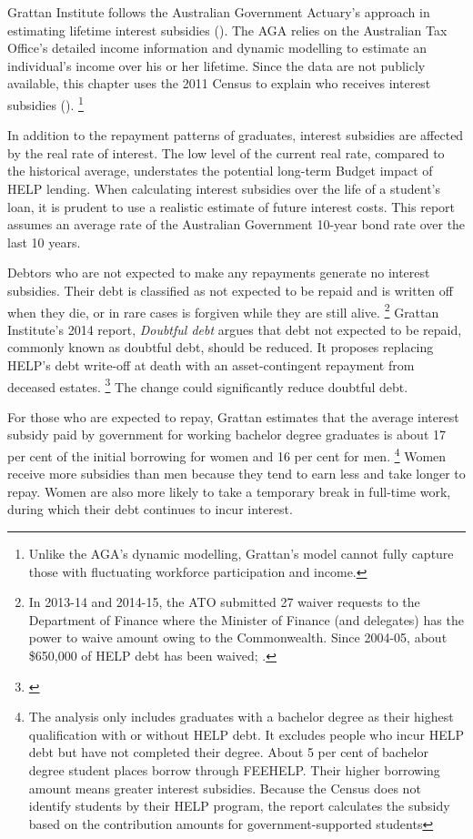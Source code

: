 \documentclass[embargoed]{grattan}
\begin{document}
Grattan Institute follows the Australian Government Actuary's approach in estimating lifetime interest subsidies ().
The \gls{AGA} relies on the Australian Tax Office's detailed income information and dynamic modelling to estimate an individual's income over his or her lifetime.
Since the data are not publicly available, this chapter uses the 2011 Census to explain who receives interest subsidies ().%
\footnote{Unlike the \gls{AGA}'s dynamic modelling, Grattan's model cannot fully capture those with fluctuating workforce participation and income.} \afterpage{\clearpage}

In addition to the repayment patterns of graduates, interest subsidies are affected by the real rate of interest.
The low level of the current real rate, compared to the historical average, understates the potential long-term Budget impact of \gls{HELP} lending.
When calculating interest subsidies over the life of a student's loan, it is prudent to use a realistic estimate of future interest costs.
This report assumes an average rate of the Australian Government 10-year bond rate over the last 10 years.


Debtors who are not expected to make any repayments generate no interest subsidies.
Their debt is classified as not expected to be repaid and is written off when they die, or in rare cases is forgiven while they are still alive.%
\footnote{In 2013-14 and 2014-15, the \gls{ATO} submitted 27 waiver requests to the Department of Finance where the Minister of Finance (and delegates) has the power to waive amount owing to the Commonwealth.
Since 2004-05, about \$650,000 of \gls{HELP} debt has been waived; \textcite[][p. 38]{ANAO2016AdministrationHigherEducation}.} Grattan Institute's 2014 report, \emph{Doubtful debt} argues that debt not expected to be repaid, commonly known as doubtful debt, should be reduced.
It proposes replacing \gls{HELP}'s debt write-off at death with an asset-contingent repayment from deceased estates.%
\footnote{\textcite{Norton2014Doubtfuldebtrising}} The change could significantly reduce doubtful debt.

For those who are expected to repay, Grattan estimates that the average interest subsidy paid by government for working bachelor degree graduates is about 17 per cent of the initial borrowing for women and 16 per cent for men.%
\footnote{The analysis only includes graduates with a bachelor degree as their highest qualification with or without \gls{HELP} debt.
It excludes people who incur \gls{HELP} debt but have not completed their degree.
About 5 per cent of bachelor degree student places borrow through \gls{FEEHELP}.
Their higher borrowing amount means greater interest subsidies. Because the Census does not identify students by their \gls{HELP} program, the report calculates the subsidy based on the contribution amounts for government-supported students}
Women receive more subsidies than men because they tend to earn less and take longer to repay.
Women are also more likely to take a temporary break in full-time work, during which their debt continues to incur interest.
\end{document}
